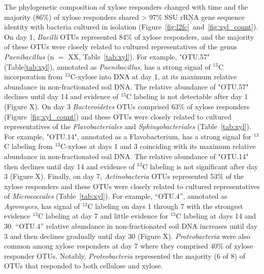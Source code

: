 The phylogenetic composition of xylose responders changed with time and the
majority (86\%) of xylose responders shared > 97\% SSU rRNA gene sequence
identity with bacteria cultured in isolation
(Figure~\ref{fig:l2fc}~and~\ref{fig:xyl_count}). On day 1, \textit{Bacilli}
OTUs represented 84\% of xylose responders, and the majority of these OTUs were
closely related to cultured representatives of the genus \textit{Paenibacillus}
(n $=$ XX, Table~\ref{tab:xyl}). For example, "OTU.57" (Table\ref{tab:xyl}),
annotated as \textit{Paenibacillus}, has a strong signal of $^{13}$C
incorporation from $^{13}$C-xylose into DNA at day 1, at its maximum relative
abundance in non-fractionated soil DNA. The relative abundance of "OTU.57"
declines until day 14 and evidence of $^{13}$C labeling is not detectable after
day 1 (Figure X). On day 3 \textit{Bacteroidetes} OTUs comprised 63\% of xylose
responders (Figure~\ref{fig:xyl_count}) and these OTUs were closely related to
cultured representatives of the \textit{Flavobacteriales} and
\textit{Sphingobacteriales} (Table~\ref{tab:xyl}). For example, "OTU.14",
annotated as a Flavobacterium, has a strong signal for $^{13}$C labeling from
$^{13}$C-xylose at days 1 and 3 coinciding with its maximum relative abundance
in non-fractionated soil DNA. The relative abundance of "OTU.14" then declines
until day 14 and evidence of $^{13}$C  labeling is not significant after day
3 (Figure X). Finally, on day 7, \textit{Actinobacteria} OTUs represented 53\%
of the xylose responders and these OTUs were closely related to cultured
representatives of \textit{Micrococcales} (Table~\ref{tab:xyl}). For example,
``OTU.4'', annotated as \textit{Agromyces}, has signal of $^{13}$C labeling
on days 1 through 7 with the strongest evidence $^{13}$C labeling at day
7 and little evidence for $^{13}$C labeling at days 14 and 30. ``OTU.4''
relative abundance in non-fractionated soil DNA increases until day 3 and
then declines gradually until day 30 (Figure X). \textit{Proteobacteria} were
also common among xylose responders at day 7 where they comprised 40\% of
xylose responder OTUs. Notably, \textit{Proteobacteria} represented the
majority (6 of 8) of OTUs that responded to both cellulose and xylose. 


